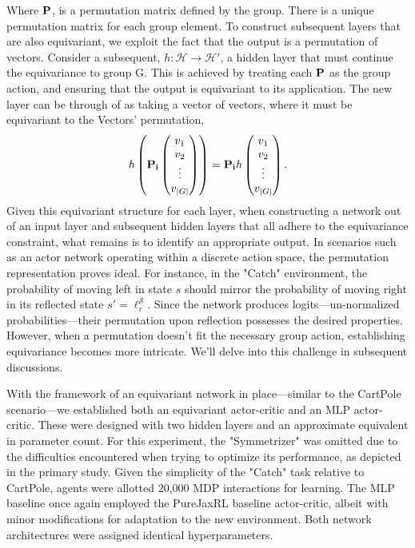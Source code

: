 Where $\mathbf{P}$, is a permutation matrix defined by the group. There is a unique permutation matrix for each group element. To construct subsequent layers that are also equivariant, we exploit the fact that the output is a permutation of vectors. Consider a subsequent, $h: \mathcal{H} \rightarrow \mathcal{H}'$, a hidden layer that must continue the equivariance to group G. This is achieved by treating each $\mathbf{P}$ as the group action, and ensuring that the output is equivariant to its application. The new layer can be through of as taking a vector of vectors, where it must be equivariant to the Vectors' permutation,
\begin{equation}
	h\left( \mathbf{P_i}
	\begin{pmatrix}
		v_1    \\
		v_2    \\
		\vdots \\
		v_{|G|}
	\end{pmatrix}
	\right) = \mathbf{P_i} h
	\begin{pmatrix}
		v_1    \\
		v_2    \\
		\vdots \\
		v_{|G|}
	\end{pmatrix}.
\end{equation}
Given this equivariant structure for each layer, when constructing a network out of an input layer and subsequent hidden layers that all adhere to the equivariance constraint, what remains is to identify an appropriate output. In scenarios such as an actor network operating within a discrete action space, the permutation representation proves ideal. For instance, in the "Catch" environment, the probability of moving left in state \( s \) should mirror the probability of moving right in its reflected state \( s' = \ell_r^\mathcal{S} \). Since the network produces logits—un-normalized probabilities—their permutation upon reflection possesses the desired properties. However, when a permutation doesn't fit the necessary group action, establishing equivariance becomes more intricate. We'll delve into this challenge in subsequent discussions.

With the framework of an equivariant network in place—similar to the CartPole scenario—we established both an equivariant actor-critic and an MLP actor-critic. These were designed with two hidden layers and an approximate equivalent in parameter count. For this experiment, the "Symmetrizer" was omitted due to the difficulties encountered when trying to optimize its performance, as depicted in the primary study. Given the simplicity of the "Catch" task relative to CartPole, agents were allotted 20,000 MDP interactions for learning. The MLP baseline once again employed the PureJaxRL baseline actor-critic, albeit with minor modifications for adaptation to the new environment. Both network architectures were assigned identical hyperparameters.

